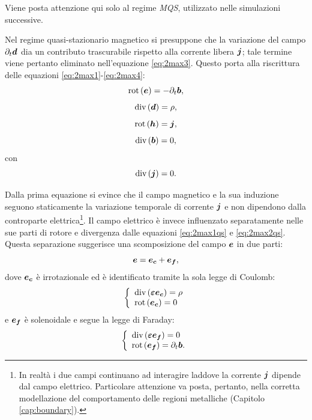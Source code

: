 Viene posta attenzione qui solo al regime \textit{MQS}, utilizzato nelle simulazioni successive.

Nel regime quasi-stazionario magnetico si presuppone che la variazione del campo $\partial_t \boldsymbol{d}$ dia un contributo trascurabile rispetto alla corrente libera $\boldsymbol{j}$; tale termine viene pertanto eliminato nell'equazione \eqref{eq:2max3}. Questo porta alla riscrittura delle equazioni \eqref{eq:2max1}-\eqref{eq:2max4}:
\begin{equation}
	\label{eq:2max1qs}
	\text{rot}\left(\boldsymbol{e}\right)=-\partial_t \boldsymbol{b},
\end{equation}
\begin{equation}
	\label{eq:2max2qs}
	\text{div}\left(\boldsymbol{d}\right)=\rho,
\end{equation}
\begin{equation}
	\label{eq:2max3qs}
	\text{rot}\left(\boldsymbol{h}\right)=\boldsymbol{j},
\end{equation}
\begin{equation}
	\label{eq:2max4qs}
	\text{div}\left(\boldsymbol{b}\right)=0,
\end{equation}
con
\begin{equation}
\label{eq:2corr1qs}
\text{div}\left(\boldsymbol{j}\right) = 0.
\end{equation}

Dalla prima equazione si evince che il campo magnetico e la  sua induzione seguono staticamente la variazione temporale di corrente $\boldsymbol{j}$ e non dipendono dalla controparte elettrica\footnote{In realtà i due campi continuano ad interagire laddove la corrente $\boldsymbol{j}$ dipende dal campo elettrico. Particolare attenzione va posta, pertanto, nella corretta modellazione del comportamento delle regioni metalliche (Capitolo \ref{cap:boundary}).}. 
Il campo elettrico è invece influenzato separatamente nelle sue parti di rotore e divergenza dalle equazioni \eqref{eq:2max1qs} e \eqref{eq:2max2qs}.
Questa separazione suggerisce una scomposizione del campo $\boldsymbol{e}$ in due parti:
\begin{equation}
\label{eq:2scomp_e}
\boldsymbol{e} = \boldsymbol{e_c}+\boldsymbol{e_f},
\end{equation} 
dove $\boldsymbol{e_c}$ è irrotazionale ed è identificato tramite la sola legge di Coulomb:
\begin{equation}
\label{eq:2e_coulomb}
\left\{
\begin{array}{l}
\text{div}\left(\boldsymbol{\varepsilon} \boldsymbol{e_c}\right) = \rho\\
\text{rot}\left(\boldsymbol{e_c}\right) = 0
\end{array}
\right.
\end{equation}
e $\boldsymbol{e_f}$ è solenoidale e segue la legge di Faraday:
\begin{equation}
\label{eq:2e_faraday}
\left\{
\begin{array}{l}
\text{div}\left(\boldsymbol{\varepsilon} \boldsymbol{e_f}\right) = 0\\
\text{rot}\left(\boldsymbol{e_f}\right) =\partial_t \boldsymbol{b}.
\end{array}
\right.
\end{equation}

